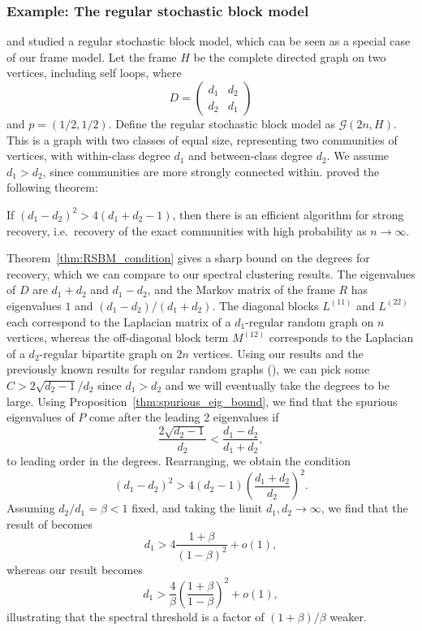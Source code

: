 \subsubsection{Example: The regular stochastic block model}

\citet*{brito2016} and \citet*{barucca2017} studied a regular stochastic block model,
which can be seen as a special case of our frame model.
Let the frame $H$ be the complete directed graph on two vertices, 
including self loops, where
\[
D = \left(
\begin{array}{cc}
d_1 & d_2\\
d_2 & d_1
\end{array}
\right)
\]
and $p = (1/2, 1/2)$.
Define the regular stochastic block model as $\mathcal{G} (2n, H)$.
This is a graph with two classes of equal size, 
representing two communities of vertices,
with within-class degree $d_1$ and between-class degree $d_2$. 
We assume $d_1 > d_2$, since communities are more strongly connected within.
\citet*{brito2016} proved the following theorem:
\begin{theorem}
\label{thm:RSBM_condition}
If $(d_1-d_2)^2 > 4 (d_1 + d_2 -1)$, then there is an efficient algorithm
for strong recovery, i.e.\ recovery of the exact communities with high probability
as $n \to \infty$.
\end{theorem}

Theorem~\ref{thm:RSBM_condition} gives a sharp bound on the degrees for recovery,
which we can compare to our spectral clustering results.
The eigenvalues of $D$ are $d_1 + d_2$ and $d_1 - d_2$,
and the Markov matrix of the frame $R$ has eigenvalues $1$ and $(d_1 - d_2) / (d_1 + d_2)$.
The diagonal blocks $L^{(11)}$ and $L^{(22)}$ each correspond to the
Laplacian matrix of a
$d_1$-regular random graph on $n$ vertices, 
whereas the off-diagonal block term $M^{(12)}$ corresponds to the Laplacian
of a $d_2$-regular bipartite graph on $2n$ vertices.
Using our results and the previously known results for regular random graphs
(\citet*{friedman2003a,friedman2004,bordenave2015a}),
we can pick some 
$C > 2 \sqrt{d_2 - 1}/d_2$ 
since $d_1 > d_2$ and we will eventually take the degrees to be large.
Using Proposition~\ref{thm:spurious_eig_bound},
we find that the spurious eigenvalues of $P$ 
come after the leading 2 eigenvalues if
\[
\frac{2 \sqrt{d_2 - 1}}{d_2} < \frac{d_1 - d_2}{d_1 + d_2},
\]
to leading order in the degrees.
Rearranging, we obtain the condition
\[
(d_1 - d_2)^2 > 4 (d_2 - 1) \left( \frac{d_1 + d_2}{d_2} \right)^2 .
\]
Assuming $d_2/d_1 = \beta < 1$ fixed, and taking the limit $d_1, d_2 \to \infty$,
we find that the result of \citet*{brito2016} becomes
\[
d_1 > 4 \frac{1+\beta}{(1-\beta)^2} + o(1),
\]
whereas our result becomes
\[
d_1 > \frac{4}{\beta} \left( \frac{1+\beta}{1-\beta} \right)^2 + o(1),
\]
illustrating that the spectral threshold is a factor of $(1+\beta)/\beta$ weaker.
